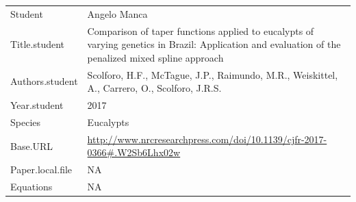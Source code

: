 \documentclass[]{article}
\begin{document}
\begin{longtable}[]{@{}ll@{}}
\toprule
\endhead
\begin{minipage}[t]{0.21\columnwidth}\raggedright
Student\strut
\end{minipage} & \begin{minipage}[t]{0.73\columnwidth}\raggedright
Angelo Manca\strut
\end{minipage}\tabularnewline
\begin{minipage}[t]{0.21\columnwidth}\raggedright
Title.student\strut
\end{minipage} & \begin{minipage}[t]{0.73\columnwidth}\raggedright
Comparison of taper functions applied to eucalypts of varying genetics
in Brazil: Application and evaluation of the penalized mixed spline
approach\strut
\end{minipage}\tabularnewline
\begin{minipage}[t]{0.21\columnwidth}\raggedright
Authors.student\strut
\end{minipage} & \begin{minipage}[t]{0.73\columnwidth}\raggedright
Scolforo, H.F., McTague, J.P., Raimundo, M.R., Weiskittel, A., Carrero,
O., Scolforo, J.R.S.\strut
\end{minipage}\tabularnewline
\begin{minipage}[t]{0.21\columnwidth}\raggedright
Year.student\strut
\end{minipage} & \begin{minipage}[t]{0.73\columnwidth}\raggedright
2017\strut
\end{minipage}\tabularnewline
\begin{minipage}[t]{0.21\columnwidth}\raggedright
Species\strut
\end{minipage} & \begin{minipage}[t]{0.73\columnwidth}\raggedright
Eucalypts\strut
\end{minipage}\tabularnewline
\begin{minipage}[t]{0.21\columnwidth}\raggedright
Base.URL\strut
\end{minipage} & \begin{minipage}[t]{0.73\columnwidth}\raggedright
\url{http://www.nrcresearchpress.com/doi/10.1139/cjfr-2017-0366\#.W2Sb6Lhx02w}\strut
\end{minipage}\tabularnewline
\begin{minipage}[t]{0.21\columnwidth}\raggedright
Paper.local.file\strut
\end{minipage} & \begin{minipage}[t]{0.73\columnwidth}\raggedright
NA\strut
\end{minipage}\tabularnewline
\begin{minipage}[t]{0.21\columnwidth}\raggedright
Equations\strut
\end{minipage} & \begin{minipage}[t]{0.73\columnwidth}\raggedright
NA\strut
\end{minipage}\tabularnewline
\bottomrule
\end{longtable}
\end{document}
